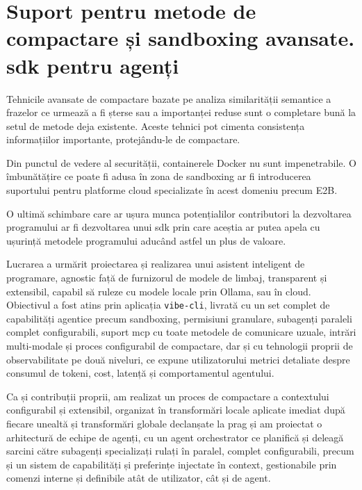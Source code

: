\documentclass[12pt, a4paper, oneside, romanian]{teza-upb}
\begin{document}
  \section{Suport pentru metode de compactare și sandboxing avansate. \ac{sdk} pentru agenți}

  Tehnicile avansate de compactare bazate pe analiza similarității semantice a frazelor ce urmează a fi șterse sau a importanței reduse sunt o completare bună la setul de metode deja existente.
  Aceste tehnici pot cimenta consistența informațiilor importante, protejându-le de compactare.

  Din punctul de vedere al securității, containerele Docker nu sunt impenetrabile. O îmbunătățire ce poate fi adusa în zona de sandboxing ar fi introducerea 
  suportului pentru platforme cloud specializate în acest domeniu precum E2B.

  O ultimă schimbare care ar ușura munca potențialilor contributori la dezvoltarea programului ar fi dezvoltarea unui \ac{sdk} prin care aceștia 
  ar putea apela cu ușurință metodele programului aducând astfel un plus de valoare.


  Lucrarea a urmărit proiectarea și realizarea unui asistent inteligent de programare, agnostic
  față de furnizorul de modele de limbaj, transparent și extensibil, capabil să ruleze cu modele locale
  prin Ollama, sau în cloud. Obiectivul a fost atins prin aplicația
  \texttt{vibe-cli}, livrată cu un set complet de capabilități agentice precum sandboxing, permisiuni granulare, subagenți paraleli complet configurabili, suport \ac{mcp} cu
  toate metodele de comunicare uzuale, intrări multi-modale și proces configurabil de compactare, dar și
  cu tehnologii proprii de observabilitate pe două niveluri, ce expune utilizatorului metrici
  detaliate despre consumul de tokeni, cost, latență și comportamentul agentului.

  Ca și contribuții proprii, am realizat un proces de compactare a contextului configurabil și extensibil,
  organizat în transformări locale aplicate imediat după fiecare unealtă și transformări globale
  declanșate la prag și am proiectat o arhitectură de echipe de agenți,
  cu un agent orchestrator ce planifică și deleagă sarcini către subagenți specializați rulați în paralel, complet
  configurabili, precum și un sistem de capabilități și preferințe injectate în context, gestionabile prin
  comenzi interne și definibile atât de utilizator, cât și de agent. 
  
\end{document}
